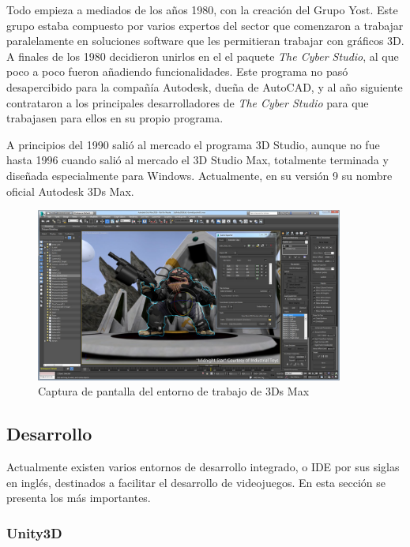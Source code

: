 Todo empieza a mediados de los años 1980, con la creación del Grupo Yost. Este grupo estaba compuesto por varios expertos del sector que comenzaron a trabajar paralelamente en soluciones software que les permitieran trabajar con gráficos 3D. A finales de los 1980 decidieron unirlos en el el paquete \textit{The Cyber Studio}, al que poco a poco fueron añadiendo funcionalidades. Este programa no pasó desapercibido para la compañía Autodesk, dueña de AutoCAD, y al año siguiente contrataron a los principales desarrolladores de \textit{The Cyber Studio} para que trabajasen para ellos en su propio programa.

A principios del 1990 salió al mercado el programa 3D Studio, aunque no fue hasta 1996 cuando salió al mercado el 3D Studio Max, totalmente terminada y diseñada especialmente para Windows. Actualmente, en su versión 9 su nombre oficial Autodesk 3Ds Max.

\begin{figure}[!h]
\begin{center}
\includegraphics[width=0.9\textwidth]{imagenes/2/3ds-max.jpg}
\caption{Captura de pantalla del entorno de trabajo de 3Ds Max}
\label{fig:3ds-max}
\end{center}
\end{figure}

\subsection{Desarrollo}

Actualmente existen varios entornos de desarrollo integrado, o \acs{IDE} por sus siglas en inglés, destinados a facilitar el desarrollo de videojuegos. En esta sección se presenta los más importantes.

\subsubsection{Unity3D}

